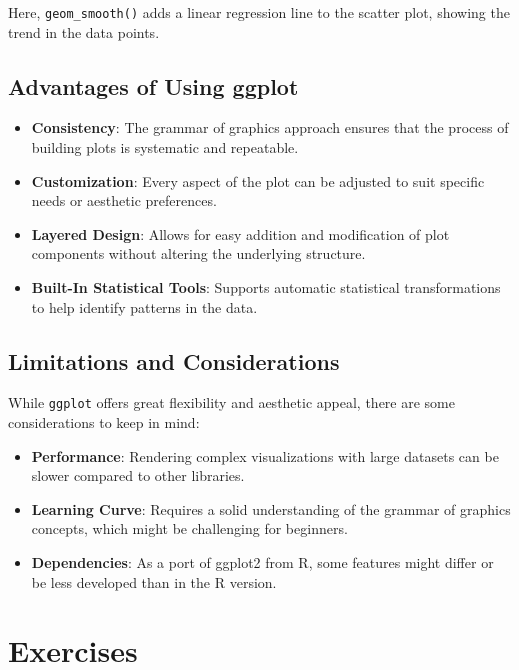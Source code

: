\documentclass[
  letterpaper,
  DIV=11,
  numbers=noendperiod]{scrreprt}
\providecommand{\tightlist}{%
  \setlength{\itemsep}{0pt}\setlength{\parskip}{0pt}}\usepackage{longtable,booktabs,array}
\begin{document}
Here, \texttt{geom\_smooth()} adds a linear regression line to the
scatter plot, showing the trend in the data points.

\hypertarget{advantages-of-using-ggplot}{%
\subsection{Advantages of Using
ggplot}\label{advantages-of-using-ggplot}}

\begin{itemize}
\tightlist
\item
  \textbf{Consistency}: The grammar of graphics approach ensures that
  the process of building plots is systematic and repeatable.
\item
  \textbf{Customization}: Every aspect of the plot can be adjusted to
  suit specific needs or aesthetic preferences.
\item
  \textbf{Layered Design}: Allows for easy addition and modification of
  plot components without altering the underlying structure.
\item
  \textbf{Built-In Statistical Tools}: Supports automatic statistical
  transformations to help identify patterns in the data.
\end{itemize}

\hypertarget{limitations-and-considerations-1}{%
\subsection{Limitations and
Considerations}\label{limitations-and-considerations-1}}

While \texttt{ggplot} offers great flexibility and aesthetic appeal,
there are some considerations to keep in mind:

\begin{itemize}
\tightlist
\item
  \textbf{Performance}: Rendering complex visualizations with large
  datasets can be slower compared to other libraries.
\item
  \textbf{Learning Curve}: Requires a solid understanding of the grammar
  of graphics concepts, which might be challenging for beginners.
\item
  \textbf{Dependencies}: As a port of ggplot2 from R, some features
  might differ or be less developed than in the R version.
\end{itemize}

\hypertarget{exercises-11}{%
\section{Exercises}\label{exercises-11}}
\end{document}
